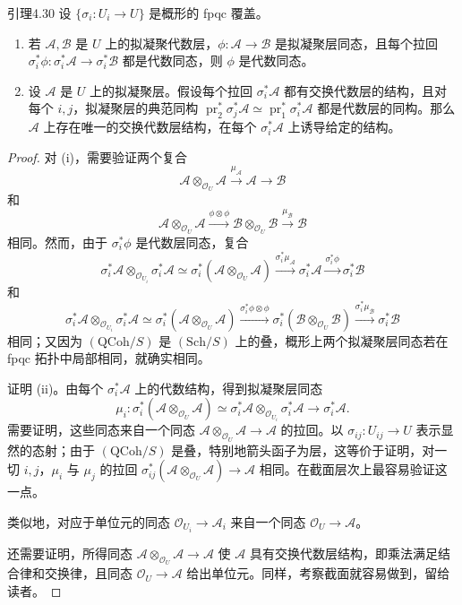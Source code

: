 \begin{origstatement}{引理}{4.30}\label{ch04:lem430}
设 $\{\sigma_i\colon U_i\to U\}$ 是概形的 fpqc 覆盖。
\begin{enumerate}
 \item[(i)] 若 $\mathcal A,\mathcal B$ 是 $U$ 上的拟凝聚代数层，$\phi\colon\mathcal A\to\mathcal B$ 是拟凝聚层同态，且每个拉回 $\sigma_i^*\phi\colon\sigma_i^*\mathcal A\to\sigma_i^*\mathcal B$ 都是代数同态，则 $\phi$ 是代数同态。
 \item[(ii)] 设 $\mathcal A$ 是 $U$ 上的拟凝聚层。假设每个拉回 $\sigma_i^*\mathcal A$ 都有交换代数层的结构，且对每个 $i,j$，拟凝聚层的典范同构 $\operatorname{pr}_2^*\sigma_j^*\mathcal A\simeq\operatorname{pr}_1^*\sigma_i^*\mathcal A$ 都是代数层的同构。那么 $\mathcal A$ 上存在唯一的交换代数层结构，在每个 $\sigma_i^*\mathcal A$ 上诱导给定的结构。
\end{enumerate}
\end{origstatement}
\begin{proof}
对 (i)，需要验证两个复合
\[
 \mathcal A\otimes_{\mathcal O_U}\mathcal A\xrightarrow{\mu_{\mathcal A}}\mathcal A\longrightarrow\mathcal B
\]
和
\[
 \mathcal A\otimes_{\mathcal O_U}\mathcal A\xrightarrow{\phi\otimes\phi}
 \mathcal B\otimes_{\mathcal O_U}\mathcal B\xrightarrow{\mu_{\mathcal B}}\mathcal B
\]
相同。然而，由于 $\sigma_i^*\phi$ 是代数层同态，复合
\[
 \sigma_i^*\mathcal A\otimes_{\mathcal O_{U_i}}\sigma_i^*\mathcal A
 \simeq\sigma_i^*(\mathcal A\otimes_{\mathcal O_U}\mathcal A)
 \xrightarrow{\sigma_i^*\mu_{\mathcal A}}\sigma_i^*\mathcal A
 \xrightarrow{\sigma_i^*\phi}\sigma_i^*\mathcal B
\]
和
\[
 \sigma_i^*\mathcal A\otimes_{\mathcal O_{U_i}}\sigma_i^*\mathcal A
 \simeq\sigma_i^*(\mathcal A\otimes_{\mathcal O_U}\mathcal A)
 \xrightarrow{\sigma_i^*\phi\otimes\phi}\sigma_i^*(\mathcal B\otimes_{\mathcal O_U}\mathcal B)
 \xrightarrow{\sigma_i^*\mu_{\mathcal B}}\sigma_i^*\mathcal B
\]
相同；又因为 $(\mathrm{QCoh}/S)$ 是 $(\mathrm{Sch}/S)$ 上的叠，概形上两个拟凝聚层同态若在 fpqc 拓扑中局部相同，就确实相同。

证明 (ii)。由每个 $\sigma_i^*\mathcal A$ 上的代数结构，得到拟凝聚层同态
\[
 \mu_i\colon\sigma_i^*(\mathcal A\otimes_{\mathcal O_U}\mathcal A)
 \simeq\sigma_i^*\mathcal A\otimes_{\mathcal O_{U_i}}\sigma_i^*\mathcal A
 \longrightarrow\sigma_i^*\mathcal A.
\]
需要证明，这些同态来自一个同态 $\mathcal A\otimes_{\mathcal O_U}\mathcal A\to\mathcal A$ 的拉回。以 $\sigma_{ij}\colon U_{ij}\to U$ 表示显然的态射；由于 $(\mathrm{QCoh}/S)$ 是叠，特别地箭头函子为层，这等价于证明，对一切 $i,j$，$\mu_i$ 与 $\mu_j$ 的拉回 $\sigma_{ij}^*(\mathcal A\otimes_{\mathcal O_U}\mathcal A)\to\mathcal A$ 相同。在截面层次上最容易验证这一点。

类似地，对应于单位元的同态 $\mathcal O_{U_i}\to\mathcal A_i$ 来自一个同态 $\mathcal O_U\to\mathcal A$。

还需要证明，所得同态 $\mathcal A\otimes_{\mathcal O_U}\mathcal A\to\mathcal A$ 使 $\mathcal A$ 具有交换代数层结构，即乘法满足结合律和交换律，且同态 $\mathcal O_U\to\mathcal A$ 给出单位元。同样，考察截面就容易做到，留给读者。
\end{proof}

